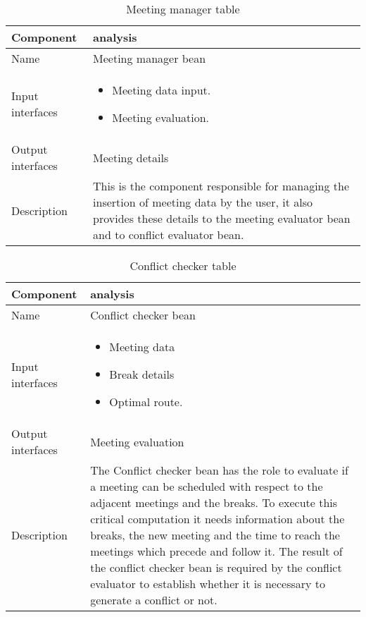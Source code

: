 \begin{flushleft}

\begin{table}[htp]

\begin{tabular}{l|p{7cm}}
 Component&analysis\\
\hline
\hline
Name&Meeting manager bean\\
\hline
Input interfaces&
	\begin{itemize}
	\item Meeting data input.
	\item Meeting evaluation.
	\end{itemize}
\\
\hline
Output interfaces& Meeting details 
\\
\hline
Description&This is the component responsible for managing the insertion of meeting data by the user, it also provides these details to the meeting evaluator bean and to conflict evaluator bean.
\\
\hline


\end{tabular}

\caption{Meeting manager  table } 
\label{tab:meetingmanagertable}

\end{table}

\end{flushleft}

\begin{flushleft}
	
	\begin{table}[htp]
		
		\begin{tabular}{l|p{7cm}}
			Component&analysis\\
			\hline
			\hline
			Name&Conflict checker bean\\
			\hline
			Input interfaces&
			\begin{itemize}
				\item Meeting data  \item Break details \item Optimal route.
			\end{itemize}
			\\
			\hline
			Output interfaces& Meeting evaluation\\
			\hline
			Description&The Conflict checker bean has the role to evaluate if a meeting can be scheduled with respect to the adjacent meetings and the breaks. To execute this critical computation it needs information about the breaks, the new meeting and the time to reach the meetings which precede and follow it. The result of the conflict checker bean is required by the conflict evaluator to establish whether it is necessary to generate a conflict or not. \\
			\hline
			
			
		\end{tabular}
		
		\caption{Conflict checker  table } 
		\label{tab:conflictcheckertable}
		
	\end{table}
	
\end{flushleft}

